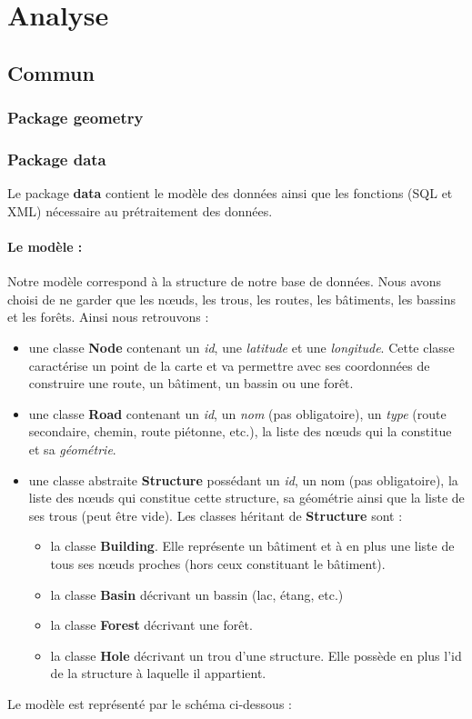 \documentclass[12pt,a4paper,oneside]{article}
\begin{document}
\newpage

\tableofcontents
\newpage

\section{Analyse}

\subsection{Commun}
\subsubsection{Package geometry}

\subsubsection{Package data}
Le package \textbf{data} contient le modèle des données ainsi que les fonctions (SQL et XML) nécessaire au prétraitement des données.
\paragraph{Le modèle : \\}
Notre modèle correspond à la structure de notre base de données. Nous avons choisi de ne garder que les nœuds, les trous, les routes, les bâtiments, les bassins et les forêts. Ainsi nous retrouvons : \\
\renewcommand{\labelitemi}{$\bullet$}
\begin{itemize}
\item une classe \textbf{Node} contenant un \textit{id}, une \textit{latitude} et une \textit{longitude}. Cette classe caractérise un point de la carte et va permettre avec ses coordonnées de construire une route, un bâtiment, un bassin ou une forêt.
\item une classe \textbf{Road} contenant un \textit{id}, un \textit{nom} (pas obligatoire),  un \textit{type} (route secondaire, chemin, route piétonne, etc.), la liste des nœuds qui la constitue et sa \textit{géométrie}.
\item une classe abstraite \textbf{Structure} possédant un \textit{id}, un {nom} (pas obligatoire), la liste des nœuds qui constitue cette structure, sa géométrie ainsi que la liste de ses trous (peut être vide). Les classes héritant de \textbf{Structure} sont :
	\begin{itemize}
	\item la classe \textbf{Building}. Elle représente un bâtiment et à en plus une liste de tous ses nœuds proches (hors ceux constituant le bâtiment).
	\item la classe \textbf{Basin} décrivant un bassin (lac, étang, etc.)
	\item la classe \textbf{Forest} décrivant une forêt.
	\item la classe \textbf{Hole} décrivant un trou d'une structure. Elle possède en plus l'id de la structure à laquelle il appartient.
	\end{itemize}
\end{itemize}
Le modèle est représenté par le schéma ci-dessous :\\
\end{document}

